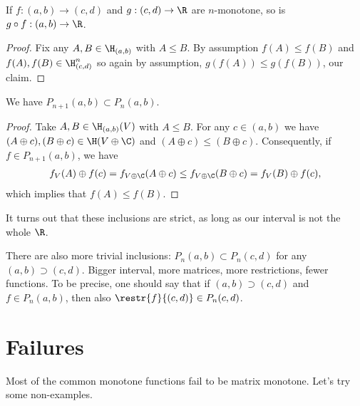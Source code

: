 \begin{prop}
	If $f : (a, b) \to (c, d)$ and $g : (c, d) \to \R$ are $n$-monotone, so is $g \circ f : (a, b) \to \R$.
\end{prop}
\begin{proof}
	Fix any $A, B \in \H_{(a, b)}$ with $A \leq B$. By assumption $f(A) \leq f(B)$ and $f(A), f(B) \in \H^{n}_{(c, d)}$ so again by assumption, $g(f(A)) \leq g(f(B))$, our claim.
\end{proof}

\begin{prop}
	We have $P_{n + 1}(a, b) \subset P_{n}(a, b)$.
\end{prop}
\begin{proof}
	Take $A, B \in \H_{(a,b)}(V)$ with $A \leq B$. For any $c \in (a, b)$ we have $(A \oplus c), (B \oplus c) \in \H(V \oplus \C)$ and $(A \oplus c) \leq (B \oplus c)$. Consequently, if $f \in P_{n + 1}(a, b)$, we have
	\begin{align*}
		f_{V}(A) \oplus f(c) = f_{V \oplus \C}(A \oplus c) \leq f_{V \oplus \C}(B \oplus c) = f_{V}(B) \oplus f(c),
	\end{align*}
	which implies that $f(A) \leq f(B)$.
\end{proof}

It turns out that these inclusions are strict, as long as our interval is not the whole $\R$.

There are also more trivial inclusions: $P_{n}(a, b) \subset P_{n}(c, d)$ for any $(a, b) \supset (c, d)$. Bigger interval, more matrices, more restrictions, fewer functions. To be precise, one should say that if $(a, b) \supset (c, d)$ and $f \in P_{n}(a, b)$, then also $\restr{f}{(c, d)} \in P_{n}(c, d)$.

\section{Failures}

Most of the common monotone functions fail to be matrix monotone. Let's try some non-examples.

